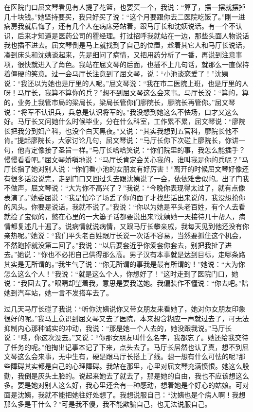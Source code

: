 \documentclass[12pt,oneside]{book}
\begin{document}
在医院门口屈文琴看见有人提了花篮，也要买一个，我说：``算了，摆一摆就摆掉几十块钱。''她坚持要买，我只好买了说：``这个月要跟你去二医院吃饭了。''刚一进病房我就后悔了，还有几个人在病床旁站着，跟马厅长和沈姨说话。有一个不认识，后来才知道是医药公司的瞿经理。打过招呼我就站在一边，那些头面人物说话我也插不进去。屈文琴倒是马上就找到了自己的位置，趁着其它人和马厅长说话，凑到床头和沈姨谈起来，先是细问了病情，又把用药分析了一番，再说到注意事项，很快就进入了角色。我站在屈文琴的后面，也插不上几句话，就那么一直保持着僵硬的笑意。过一会马厅长注意到了屈文琴，说：``小池谈恋爱了！''沈姨说：``我还以为她也是厅里的人呢。''屈文琴说：``我在市二医院上班，也是厅里的人呀！马厅长，我算不算你的兵？''想不到屈文琴这么会来事。马厅长说：``算的，算的，业务上我管市局的梁局长，梁局长管你们廖院长，廖院长再管你。''屈文琴说：``将军不认识兵，兵总是认识将军的。''我没想到她这么不怯场，口才又这么好。马厅长又问她什么时候毕业，分在什么科室，工作累不累，屈文琴说：``廖院长把我分到妇产科，也没个白天黑夜。''又说：``其实我想到五官科，廖院长他不肯。''提起廖院长，大家讨论几句，屈文琴说：``马厅长你下次碰上廖院长，你讲一句，他肯定像接了圣旨一样。''马厅长哈哈笑说：``你们院里的事，我怎么能插手？慢慢看看吧。''屈文琴娇嗔地说：``马厅长肯定会关心我的，谁叫我是你的兵呢？''马厅长指了她对别人说：``你们看小池的女朋友有好厉害！''离开的时候屈文琴好像还有很多话没说完，走到门口又回过头去跟沈姨说了一会，依依难舍似的。出了门我不做声，屈文琴说：``大为你不高兴了？''我说：``今晚你表现得太过了，就有点像表演了。''她委屈说：``我是怕冷了场丢了你的面子才找些话出来说的，我没想抢你的风头。你要是说话，我就不说了。''我说：``你以为她是平头老百姓，有个人去看就捡了宝似的，憋在心里的一大篓子话都要说出来?沈姨她一天接待几十帮人，病情都复述几十遍了。说病情就说病情，又跟马厅长攀亲戚，我每天见到他还没有你亲热呢。''她说：``我们平头老百姓跟厅长说一次话不容易，当然要抓住这个机会，不然跑掉就没第二回了。''我说：``以后要套近乎你爱套你套去，别把我扯了进去。''她说：``你也不必把自己供得那么高。男子汉有本事就是达到目标，走哪条路其实是无所谓的。''我生气了说：``你无所谓的事我是最有所谓的！''她说：``大为你怎么这么个人！''我说：``就是这么个人，你想好了！''这时走到了医院门口，她说：``我回去了。''眼睛却望着我，意思是要我送她。我偏装作不懂说：``你去吧。''陪她到汽车站，她一言不发搭车去了。

过几天马厅长碰了我说：``听你沈姨说你又带女朋友来看她了，她对你女朋友印象很好的呢。''我马上意识到屈文琴又去了医院，本来想含糊应一声就过去了，可无法抑制内心那种诚实的冲动，我说：``那是她一个人去的，她没跟我说。''马厅长说：``哦，你这次没去。''又说：``你那女朋友叫什么名字，我都忘了。她还给我交待了任务的呢。''他掏出记事本记了下来，点头去了。马厅长居然也认了真，想不到屈文琴这么会来事，无中生有，硬是跟马厅长搭上了线。想一想有什么可怯的呢?那些障碍其实都是自己的心理障碍。我站在那里，心里对屈文琴充满愤恨。她这么殷勤，我倒是灰头土脸的。说起来她去了就去了，那是她的自由，我也不应该想这么多。要是她对别人这么好，我心里还会有一种感动，想着她是个好心的姑娘。可对面是沈姨，我就不能把她往好处想了。我想说服自己：``沈姨也是个病人啊！我想那么多是干什么？''可是我不傻，我不能欺骗自己，也无法说服自己。
\end{document}
